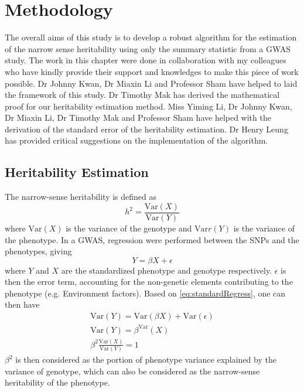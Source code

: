 \documentclass{book}
\begin{document}
	\section{Methodology}	
		The overall aims of this study is to develop a robust algorithm for the estimation of the narrow sense heritability using only the summary statistic from a \gls{GWAS} study. The work in this chapter were done in collaboration with my colleagues who have kindly provide their support and knowledges to make this piece of work possible.
		Dr Johnny Kwan, Dr Miaxin Li and Professor Sham have helped to laid the framework of this study. Dr Timothy Mak has derived the mathematical proof for our heritability estimation method. Miss Yiming Li, Dr Johnny Kwan, Dr Miaxin Li, Dr Timothy Mak and Professor Sham have helped with the derivation of the standard error of the heritability estimation. Dr Henry Leung has provided critical suggestions on the implementation of the algorithm.
		\subsection{Heritability Estimation}
			The narrow-sense heritability is defined as 
			$$
				h^2 = \frac{\mathrm{Var}(X)}{\mathrm{Var}(Y)}
			$$
			where $\mathrm{Var}(X)$ is the variance of the genotype and $\mathrm{Var}r(Y)$ is the variance of the phenotype.
			In a \gls{GWAS}, regression were performed between the \glspl{SNP} and the phenotypes, giving
			\begin{equation}
				Y=\beta X+\epsilon
				\label{eq:standardRegress}
			\end{equation}
			where $Y$ and $X$ are the standardized phenotype and genotype respectively. 
			$\epsilon$ is then the error term, accounting for the non-genetic elements contributing to the phenotype (e.g. Environment factors).
			Based on \cref{eq:standardRegress}, one can then have
			\begin{align}
				\mathrm{Var}(Y) = \mathrm{Var}(\beta X)+ \mathrm{Var}(\epsilon) \nonumber\\
				\mathrm{Var}(Y) = \beta^\mathrm{Var}(X) \nonumber\\
				\beta^2\frac{\mathrm{Var}(X)}{\mathrm{Var}(Y)}= 1
				\label{eq:betaHeri}
			\end{align}
			$\beta^2$ is then considered as the portion of phenotype variance explained by the variance of genotype, which can also be considered as the narrow-sense heritability of the phenotype.
					
\end{document}

